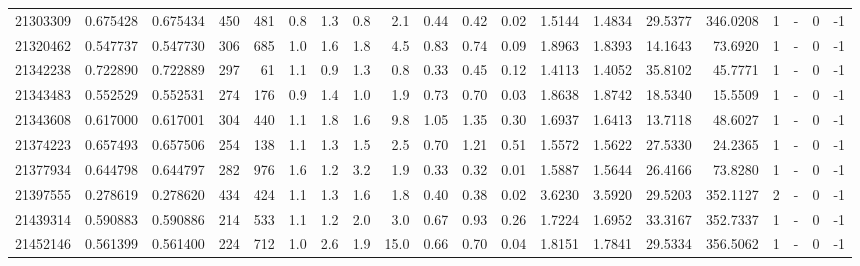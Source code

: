 \begin{tabular}{rrrrrrrrrrrrrrrrrlrl}
  21303309 & 0.675428 &   0.675434 &  450 &  481 &      0.8 &      1.3 &     0.8 &      2.1 &       0.44 &        0.42 &        0.02 &  1.5144 &  1.4834 &   29.5377 &  346.0208 &       1 &             - &        0 &        -1 \\
  21320462 & 0.547737 &   0.547730 &  306 &  685 &      1.0 &      1.6 &     1.8 &      4.5 &       0.83 &        0.74 &        0.09 &  1.8963 &  1.8393 &   14.1643 &   73.6920 &       1 &             - &        0 &        -1 \\
  21342238 & 0.722890 &   0.722889 &  297 &   61 &      1.1 &      0.9 &     1.3 &      0.8 &       0.33 &        0.45 &        0.12 &  1.4113 &  1.4052 &   35.8102 &   45.7771 &       1 &             - &        0 &        -1 \\
  21343483 & 0.552529 &   0.552531 &  274 &  176 &      0.9 &      1.4 &     1.0 &      1.9 &       0.73 &        0.70 &        0.03 &  1.8638 &  1.8742 &   18.5340 &   15.5509 &       1 &             - &        0 &        -1 \\
  21343608 & 0.617000 &   0.617001 &  304 &  440 &      1.1 &      1.8 &     1.6 &      9.8 &       1.05 &        1.35 &        0.30 &  1.6937 &  1.6413 &   13.7118 &   48.6027 &       1 &             - &        0 &        -1 \\
  21374223 & 0.657493 &   0.657506 &  254 &  138 &      1.1 &      1.3 &     1.5 &      2.5 &       0.70 &        1.21 &        0.51 &  1.5572 &  1.5622 &   27.5330 &   24.2365 &       1 &             - &        0 &        -1 \\
  21377934 & 0.644798 &   0.644797 &  282 &  976 &      1.6 &      1.2 &     3.2 &      1.9 &       0.33 &        0.32 &        0.01 &  1.5887 &  1.5644 &   26.4166 &   73.8280 &       1 &             - &        0 &        -1 \\
  21397555 & 0.278619 &   0.278620 &  434 &  424 &      1.1 &      1.3 &     1.6 &      1.8 &       0.40 &        0.38 &        0.02 &  3.6230 &  3.5920 &   29.5203 &  352.1127 &       2 &             - &        0 &        -1 \\
  21439314 & 0.590883 &   0.590886 &  214 &  533 &      1.1 &      1.2 &     2.0 &      3.0 &       0.67 &        0.93 &        0.26 &  1.7224 &  1.6952 &   33.3167 &  352.7337 &       1 &             - &        0 &        -1 \\
  21452146 & 0.561399 &   0.561400 &  224 &  712 &      1.0 &      2.6 &     1.9 &     15.0 &       0.66 &        0.70 &        0.04 &  1.8151 &  1.7841 &   29.5334 &  356.5062 &       1 &             - &        0 &        -1 \\

\end{tabular}
